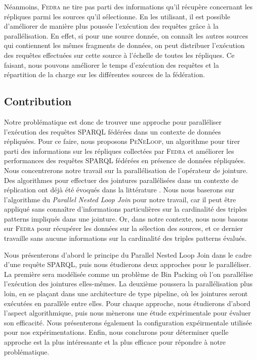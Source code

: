 \documentclass[a4paper]{article}
\def\sparql{\textsc{SPARQL}\xspace}
\def\fedra{\textsc{Fedra}\xspace}
\def\peneloop{\textsc{PeNeLoop}\xspace}
\begin{document}
Néanmoins, \fedra ne tire pas parti des informations qu'il récupère concernant les répliques parmi les sources qu'il sélectionne. En les utilisant, il est possible d'améliorer de manière plus poussée l'exécution des requêtes grâce à la parallélisation. En effet, si pour une source donnée, on connaît les autres sources qui contiennent les mêmes fragments de données, on peut distribuer l'exécution des requêtes effectuées sur cette source à l'échelle de toutes les répliques. Ce faisant, nous pouvons améliorer le temps d'exécution des requêtes et la répartition de la charge sur les différentes sources de la fédération.

\subsection{Contribution}

Notre problématique est donc de trouver une approche pour paralléliser l'exécution des requêtes \sparql fédérées dans un contexte de données répliquées. Pour ce faire, nous proposons \peneloop, un algorithme pour tirer parti des informations sur les répliques collectées par \fedra et améliorer les performances des requêtes \sparql fédérées en présence de données répliquées. Nous concentrerons notre travail sur la parallélisation de l'opérateur de jointure. Des algorithmes pour effectuer des jointures parallélisées dans un contexte de réplication ont déjà été évoqués dans la littérature \cite{ozsu2011principles}. Nous nous baserons sur l'algorithme du \textit{Parallel Nested Loop Join} pour notre travail, car il peut être appliqué sans connaître d'informations particulières sur la cardinalité des triples patterns impliqués dans une jointure. Or, dans notre contexte, nous nous basons sur \fedra pour récupérer les données sur la sélection des sources, et ce dernier travaille sans aucune informations sur la cardinalité des triples patterns évalués.

Nous présenterons d'abord le principe du Parallel Nested Loop Join dans le cadre d'une requête \sparql, puis nous étudierons deux approches pour le paralléliser. La première sera modélisée comme un problème de Bin Packing où l'on parallélise l'exécution des jointures elles-mêmes. La deuxième poussera la parallélisation plus loin, en se plaçant dans une architecture de type pipeline, où les jointures seront exécutées en parallèle entre elles. Pour chaque approche, nous étudierons d'abord l'aspect algorithmique, puis nous mènerons une étude expérimentale pour évaluer son efficacité. Nous présenterons également la configuration expéirmentale utilisée pour nos expérimentations. Enfin, nous conclurons pour déterminer quelle approche est la plus intéressante et la plus efficace pour répondre à notre problématique.
\end{document}
